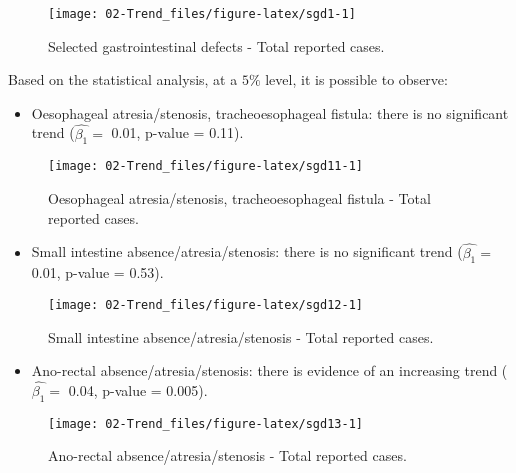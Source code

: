 \documentclass[
]{krantz}
\providecommand{\tightlist}{%
  \setlength{\itemsep}{0pt}\setlength{\parskip}{0pt}}
\begin{document}
\begin{figure}[h]

{\centering \texttt{[image: 02-Trend\_files/figure-latex/sgd1-1]} 

}

\caption{Selected gastrointestinal defects - Total reported cases.}\label{fig:sgd1}
\end{figure}

Based on the statistical analysis, at a \(5\%\) level, it is possible to observe:

\begin{itemize}
\tightlist
\item
  Oesophageal atresia/stenosis, tracheoesophageal fistula: there is no significant trend (\(\hat{\beta_{1}} =\) 0.01, p-value = 0.11).
\end{itemize}

\begin{figure}[h]

{\centering \texttt{[image: 02-Trend\_files/figure-latex/sgd11-1]} 

}

\caption{Oesophageal atresia/stenosis, tracheoesophageal fistula - Total reported cases.}\label{fig:sgd11}
\end{figure}

\begin{itemize}
\tightlist
\item
  Small intestine absence/atresia/stenosis: there is no significant trend (\(\hat{\beta_{1}} =\) 0.01, p-value = 0.53).
\end{itemize}

\begin{figure}[h]

{\centering \texttt{[image: 02-Trend\_files/figure-latex/sgd12-1]} 

}

\caption{Small intestine absence/atresia/stenosis - Total reported cases.}\label{fig:sgd12}
\end{figure}

\begin{itemize}
\tightlist
\item
  Ano-rectal absence/atresia/stenosis: there is evidence of an increasing trend (\(\hat{\beta_{1}} =\) 0.04, p-value = 0.005).
\end{itemize}

\begin{figure}[h]

{\centering \texttt{[image: 02-Trend\_files/figure-latex/sgd13-1]} 

}

\caption{Ano-rectal absence/atresia/stenosis - Total reported cases.}\label{fig:sgd13}
\end{figure}
\end{document}
